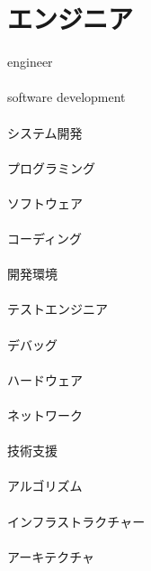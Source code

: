 \section*{エンジニア}
engineer
\\\\
software development
\\\\
システム開発
\\\\
プログラミング
\\\\
ソフトウェア
\\\\
コーディング
\\\\
開発環境
\\\\
テストエンジニア
\\\\
デバッグ
\\\\
ハードウェア
\\\\
ネットワーク
\\\\
技術支援
\\\\
アルゴリズム
\\\\
インフラストラクチャー
\\\\
アーキテクチャ
